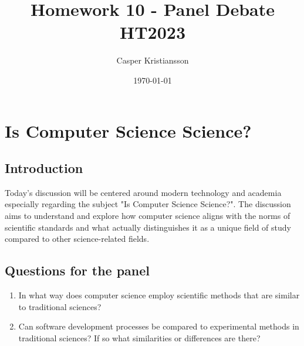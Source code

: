 \documentclass{article}
\title{Homework 10 - Panel Debate\\HT2023}
\author{Casper Kristiansson}
\date{\today}
\begin{document}
\maketitle

\section{Is Computer Science Science?}
\subsection{Introduction}
Today's discussion will be centered around modern technology and academia especially regarding the subject "Is Computer Science Science?". The discussion aims to understand and explore how computer science aligns with the norms of scientific standards and what actually distinguishes it as a unique field of study compared to other science-related fields.

\subsection{Questions for the panel}
\begin{enumerate}
    \item In what way does computer science employ scientific methods that are similar to traditional sciences?
    \item Can software development processes be compared to experimental methods in traditional sciences? If so what similarities or differences are there?
\end{enumerate}
\end{document}
